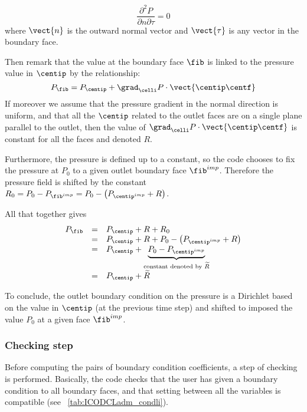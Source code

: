 \begin{equation*}
\displaystyle\frac{\partial^2 P}{\partial n \partial \tau } = 0
\end{equation*}
where $\vect{n}$ is the outward normal vector and  $\vect{\tau}$ is any 
vector in the boundary face.

Then remark that the value at the boundary face $\fib$ is linked
to the pressure value in $\centip$ by the relationship:
\begin{equation*}
P_\fib = P_{\centip} +  \grad_\celli P \cdot \vect{\centip\centf}
\end{equation*}
If moreover we assume that the pressure gradient in the normal direction
is uniform, and that all the $\centip$ related to the outlet faces are on 
a single plane parallel to the outlet, then the value of $ \grad_\celli P \cdot \vect{\centip\centf} $
is constant for all the faces and denoted $R$. 

Furthermore, the pressure is defined up to a constant, so the code
chooses to fix the pressure at $P_0$ to a given outlet boundary face 
$\fib^{imp}$. Therefore the pressure field is shifted  by the constant
$R_0=P_0- P_{\fib^{imp}} = P_0 - \left( P_{{\centip}^{imp}}+R \right)$.

All that together gives
\begin{equation}\label{Base_Condli_eq_psortie_condli}
\begin{array}{rcl}
P_\fib &=& P_{\centip}+R+R_0\\
   &=& P_{\centip}+R+P_0- \left( P_{{\centip}^{imp}}+R \right)\\
   &=&P_{\centip} +\underbrace{P_0-P_{{\centip}^{imp}}}_{\text{constant denoted by $\widetilde{R}$}}\\
   &=&P_{\centip} + \widetilde{R}
\end{array}
\end{equation}

To conclude, the outlet boundary condition on the pressure is a Dirichlet based on 
the value in $\centip$ (at the previous time step) and shifted to imposed
the value $P_0$ at a given face $\fib^{imp}$.

\subsubsection{Checking step}

 Before computing the pairs of boundary condition coefficients, a step of checking is performed. Basically, 
the code checks that the user has given a boundary condition to all boundary faces, and that 
setting between all the variables is compatible (see \tablename~\ref{tab:ICODCLadm_condli}).




